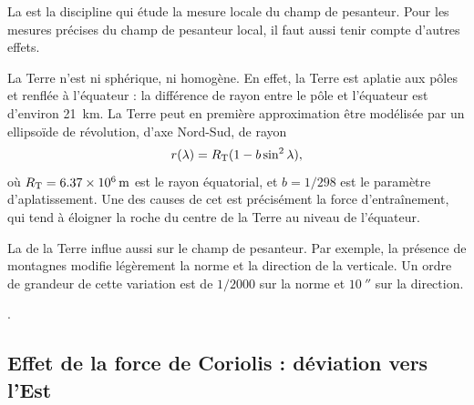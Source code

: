 \documentclass[12pt,fancy]{cours}
\begin{document}
La  est la discipline qui étude la mesure locale du champ de pesanteur.
Pour les mesures précises du champ de pesanteur local, il faut aussi tenir compte d'autres effets.
\begin{liste}
  \item La Terre n'est ni sphérique, ni homogène. En effet, la Terre est aplatie aux pôles et renflée à l'équateur : la différence de rayon entre le pôle et l'équateur est d'environ \SI{21}{km}. La Terre peut en première approximation être modélisée par un ellipsoïde de révolution, d'axe Nord-Sud, de rayon 
  \begin{equation}
    r(\lambda) = R_{\rm T}({1 - b \sin^2\lambda}),
  \end{equation}
  où $R_{\rm T} = \SI{6.37e6}{m}$ est le rayon équatorial, et $b = 1/298$ est le paramètre d'aplatissement. Une des causes de cet  est précisément la force d'entraînement, qui tend à éloigner la roche du centre de la Terre au niveau de l'équateur.
  \item La  de la Terre influe aussi sur le champ de pesanteur. Par exemple, la présence de montagnes modifie légèrement la norme et la direction de la verticale. Un ordre de grandeur de cette variation est de $1/2000$ sur la norme et $\SI{10}{''}$ sur la direction.
\end{liste}



.

\subsection{Effet de la force de Coriolis : déviation vers l'Est}
\label{sec:dev_est}
\end{document}
